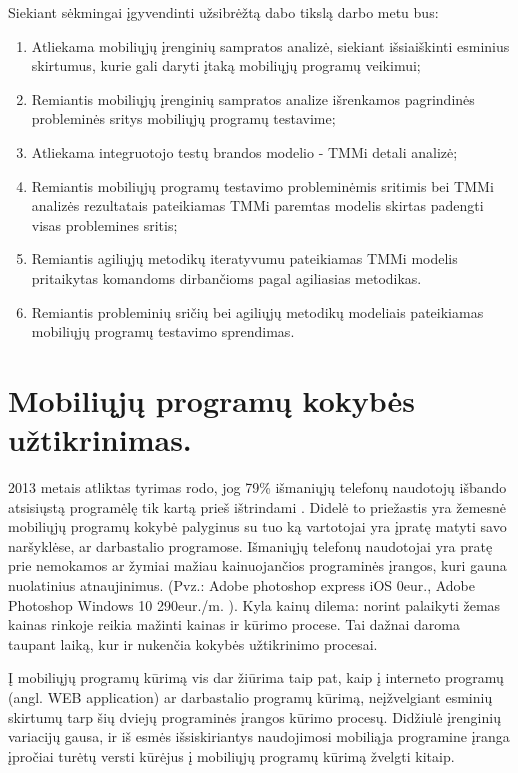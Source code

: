 \documentclass{VUMIFPSkursinis}
\begin{document}
Siekiant sėkmingai įgyvendinti užsibrėžtą dabo tikslą darbo metu bus:
\begin{enumerate}
   \item Atliekama mobiliųjų įrenginių sampratos analizė, siekiant išsiaiškinti esminius skirtumus, kurie gali daryti įtaką mobiliųjų programų veikimui;
   \item Remiantis mobiliųjų įrenginių sampratos analize išrenkamos pagrindinės probleminės sritys mobiliųjų programų testavime;
   \item Atliekama integruotojo testų brandos modelio - TMMi detali analizė;
   \item Remiantis mobiliųjų programų testavimo probleminėmis sritimis bei TMMi analizės rezultatais pateikiamas TMMi paremtas modelis skirtas padengti visas problemines sritis;
   \item Remiantis agiliųjų metodikų iteratyvumu pateikiamas TMMi modelis pritaikytas komandoms dirbančioms pagal agiliasias metodikas.
   \item Remiantis probleminių sričių bei agiliųjų metodikų modeliais pateikiamas mobiliųjų programų testavimo sprendimas.
\end{enumerate}



\section{Mobiliųjų programų kokybės užtikrinimas.}

2013 metais atliktas tyrimas rodo, jog 79\% išmaniųjų telefonų naudotojų išbando atsisiųstą programėlę tik kartą prieš ištrindami \cite{compuware.com}. Didelė to priežastis yra žemesnė mobiliųjų programų kokybė palyginus su tuo ką vartotojai yra įpratę matyti savo naršyklėse, ar darbastalio programose. Išmaniųjų telefonų naudotojai yra pratę prie nemokamos ar žymiai mažiau kainuojančios programinės įrangos, kuri gauna nuolatinius atnaujinimus. (Pvz.: Adobe photoshop express iOS 0eur., Adobe Photoshop Windows 10 290eur./m. \cite{adobe.com}). Kyla kainų dilema: norint palaikyti žemas kainas rinkoje reikia mažinti kainas ir kūrimo procese. Tai dažnai daroma taupant laiką, kur ir nukenčia kokybės užtikrinimo procesai.

Į mobiliųjų programų kūrimą vis dar žiūrima taip pat, kaip į interneto programų (angl. WEB application) ar darbastalio programų kūrimą, neįžvelgiant esminių skirtumų tarp šių dviejų programinės įrangos kūrimo procesų. Didžiulė įrenginių variacijų gausa, ir iš esmės išsiskiriantys naudojimosi mobiliąja programine įranga įpročiai turėtų versti kūrėjus į mobiliųjų programų kūrimą žvelgti kitaip.
\end{document}
